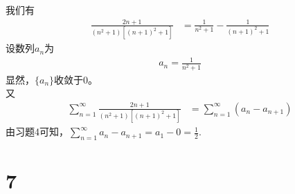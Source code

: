 \documentclass{article}
\begin{document}
\begin{itemize}
        我们有
        \begin{align*}
          \frac{2n + 1}{(n^2 + 1)[(n+1)^2 + 1]}
           & = \frac{1}{n^2 + 1} - \frac{1}{(n+1)^2 + 1}
        \end{align*}
        设数列${a_n}$为
        \begin{align*}
          a_n = \frac{1}{n^2 + 1}
        \end{align*}
        显然，$\{a_n\}$收敛于$0$。\\
        又
        \begin{align*}
          \sum \limits_{n = 1}^\infty \frac{2n + 1}{(n^2 + 1)[(n+1)^2 + 1]}
           & = \sum \limits_{n = 1}^\infty (a_n - a_{n + 1})
        \end{align*}
        由习题4可知，$\sum \limits_{n = 1}^\infty a_n - a_{n + 1} = a_1 - 0 = \frac{1}{2}$.
\end{itemize}

\section*{7}
\end{document}
